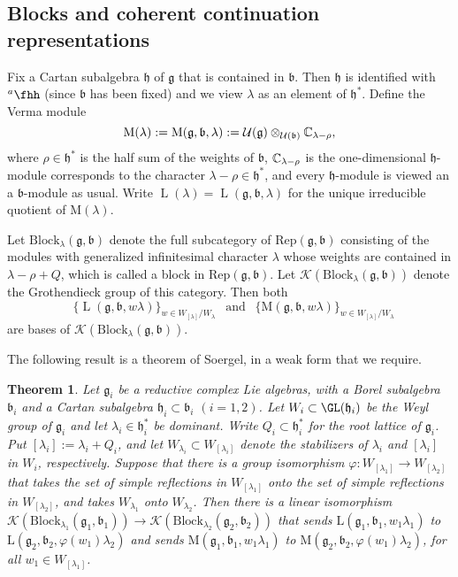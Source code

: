 \documentclass[12pt,a4paper]{amsart}
\newcommand{\CK}{{\mathcal {K}}}
\newcommand{\CU}{{\mathcal {U}}}
\newcommand{\oL}{\operatorname{L}}
\newcommand{\g}{\mathfrak g}
\newcommand{\h}{\mathfrak h}
\renewcommand{\b}{\mathfrak b}
\numberwithin{equation}{section}
\newtheorem{thm}{Theorem}[section]
\theoremstyle{remark}
\def\hha{{}^a\fhh}
\begin{document}
\subsection{Blocks and coherent continuation representations}%

Fix a Cartan subalgebra $\h$ of $\g$ that is contained in $\b$. Then $\h$ is identified with $\hha$ (since $\b$ has been fixed) and we view $\lambda$ as an element of $\h^*$.
Define the Verma module
\[
  \mathrm M(\lambda):=\mathrm M(\g,\b,\lambda):=\CU(\g)\otimes_{\CU(\b)} \C_{\lambda-\rho},
\]
where $\rho\in \h^*$ is the half sum of the weights of $\b$, $\mathbb{C}_{\lambda-\rho}$ is the one-dimensional $\h$-module corresponds to the character $\lambda-\rho\in \h^*$, and every $\h$-module is viewed an a $\b$-module as usual.
Write
$\oL(\lambda)=\oL(\g,\b,\lambda)$ for the unique irreducible quotient of $ \mathrm M(\lambda)$.

Let $\mathrm{Block}_{\lambda}(\g, \b)$ denote the full subcategory of $\mathrm{Rep}(\g, \b)$ consisting of the modules with generalized infinitesimal character  $\lambda$ whose weights are contained in $\lambda-\rho+Q$, which is called a block in  $\mathrm{Rep}(\g, \b)$. Let $\CK(\mathrm{Block}_{\lambda}(\g, \b))$ denote the Grothendieck group of this category. Then both \[
\textrm{ $\{\oL(\g,\b, w \lambda)\}_{w\in W_{[\lambda]}/W_\lambda}\ \ $ and $\ \  \{\mathrm M(\g,\b, w \lambda)\}_{w\in W_{[\lambda]}/W_\lambda}$}
\]
 are bases of   $\CK(\mathrm{Block}_{\lambda}(\g, \b))$.

The following result is a theorem of Soergel, in a weak form that we require.

\begin{thm}\label{soer}\cite[Section 2.5, Theorem 11]{Soergel}
Let $\g_i$ be a  reductive complex  Lie algebras, with a Borel subalgebra $\b_i$ and a Cartan subalgebra $\h_i\subset \b_i$ $(i=1,2)$. Let $W_i\subset \GL(\h_i)$ be the Weyl group of $\g_i$ and let $\lambda_i\in \h_i^*$ be dominant.  Write $Q_i\subset \h_i^*$ for the root lattice of $\g_i$. Put $[\lambda_i]:=\lambda_i+Q_i$, and let
$
 W_{\lambda_i}\subset W_{[\lambda_i]}
$
denote the stabilizers of $\lambda_i$ and $ [\lambda_i]$ in $W_i$, respectively. Suppose that  there is a  group
isomorphism $\varphi: W_{[\lambda_1]}\rightarrow W_{[\lambda_2]}$ that  takes the set of simple reflections in $W_{[\lambda_1]}$ onto the set of simple reflections in $W_{[\lambda_2]}$, and takes $W_{\lambda_1}$  onto  $ W_{\lambda_2}$. Then there is a linear isomorphism   $\CK(\mathrm{Block}_{\lambda_1}(\g_1, \b_1))\rightarrow \CK(\mathrm{Block}_{\lambda_2}(\g_2, \b_2))$ that sends $\mathrm L(\g_1,\b_1,w_1\lambda_1)$ to $\mathrm L(\g_2,\b_2,\varphi(w_1)\lambda_2)$ and sends $\mathrm M(\g_1,\b_1,w_1\lambda_1)$ to $\mathrm M(\g_2,\b_2,\varphi(w_1)\lambda_2)$, for all $w_1\in W_{[\lambda_1]}$.

\end{thm}
\end{document}
